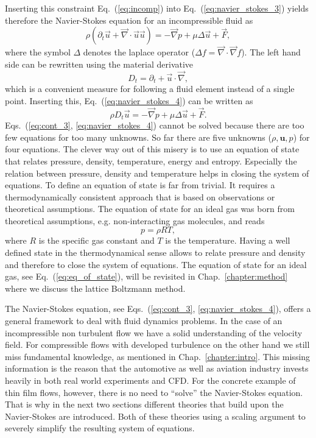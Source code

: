 Inserting this constraint Eq.~(\ref{eq:incomp}) into Eq.~(\ref{eq:navier_stokes_3}) yields therefore the Navier-Stokes equation for an incompressible fluid as
\begin{equation}\label{eq:navier_stokes_4}
    \rho(\partial_t\vec{u} + \vec{\nabla}\cdot\vec{u}\vec{u}) = - \vec{\nabla} p + \mu\Delta\vec{u} + \vec{F},
\end{equation}
where the symbol $\Delta$ denotes the laplace operator ($\Delta f = \vec{\nabla}\cdot\vec{\nabla} f$).
The left hand side can be rewritten using the material derivative
\begin{equation}\label{eq:mat_dev}
    D_t = \partial_t + \vec{u}\cdot\vec{\nabla}, 
\end{equation}
which is a convenient measure for following a fluid element instead of a single point.
Inserting this, Eq.~(\ref{eq:navier_stokes_4}) can be written as
\begin{equation}\label{eq:navier_stokes_fin}
    \rho D_t \vec{u} =  - \vec{\nabla} p + \mu\Delta\vec{u} + \vec{F}.
\end{equation}
Eqs.~(\ref{eq:cont_3}, \ref{eq:navier_stokes_4}) cannot be solved because there are too few equations for too many unknowns.
So far there are five unknowns ($\rho, \mathbf{u}, p$) for four equations.
The clever way out of this misery is to use an equation of state that relates pressure, density, temperature, energy and entropy.
Especially the relation between pressure, density and temperature helps in closing the system of equations.
To define an equation of state is far from trivial.
It requires a thermodynamically consistent approach that is based on observations or theoretical assumptions.
The equation of state for an ideal gas was born from theoretical assumptions, e.g. non-interacting gas molecules, and reads~\cite{schwablStatisticalMechanics2006}
\begin{equation}\label{eq:eq_of_state}
    p = \rho R T,
\end{equation}
where $R$ is the specific gas constant and $T$ is the temperature.
Having a well defined state in the thermodynamical sense allows to relate pressure and density and therefore to close the system of equations.
The equation of state for an ideal gas, see Eq.~(\ref{eq:eq_of_state}), will be revisited in Chap.~\ref{chapter:method} where we discuss the lattice Boltzmann method.

The Navier-Stokes equation, see Eqs.~(\ref{eq:cont_3}, \ref{eq:navier_stokes_4}), offers a general framework to deal with fluid dynamics problems.
In the case of an incompressible non turbulent flow we have a solid understanding of the velocity field.
For compressible flows with developed turbulence on the other hand we still miss fundamental knowledge, as mentioned in Chap.~\ref{chapter:intro}.
This missing information is the reason that the automotive as well as aviation industry invests heavily in both real world experiments and CFD. 
For the concrete example of thin film flows, however, there is no need to ``solve'' the Navier-Stokes equation.
That is why in the next two sections different theories that build upon the Navier-Stokes are introduced.
Both of these theories using a scaling argument to severely simplify the resulting system of equations.

